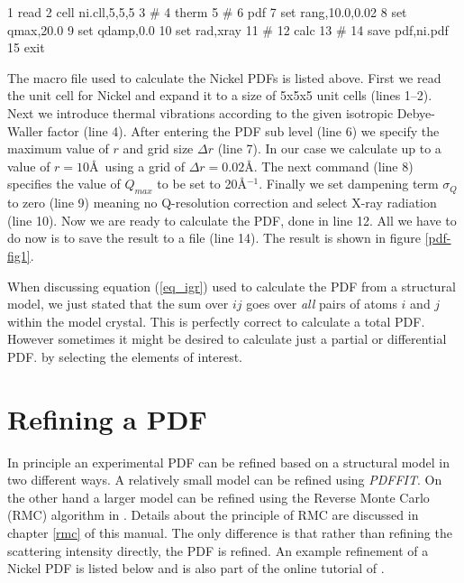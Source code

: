 \begin{MacVerbatim}
      1 read
      2 cell ni.cll,5,5,5
      3 #
      4 therm
      5 #
      6 pdf
      7   set rang,10.0,0.02
      8   set qmax,20.0
      9   set qdamp,0.0
     10   set rad,xray
     11 #
     12   calc
     13 #
     14   save pdf,ni.pdf
     15 exit
\end{MacVerbatim}
%
The macro file used to calculate the Nickel PDFs is listed above.
First we read the unit cell for Nickel and expand it to a size of
5x5x5 unit cells (lines 1--2). Next we introduce thermal vibrations
according to the given isotropic Debye-Waller factor (line 4). After
entering the PDF sub level (line 6) we specify the maximum value of
$r$ and grid size $\Delta r$ (line 7). In our case we calculate up
to a value of $r=10$\AA\ using a grid of $\Delta r=0.02$\AA. The
next command (line 8) specifies the value of $Q_{max}$ to be set to
20\AA$^{-1}$. Finally we set dampening term $\sigma_{Q}$ to 
zero (line 9) meaning
no Q-resolution correction and select X-ray radiation (line 10). Now
we are ready to calculate the PDF, done in line 12. All we have to
do now is to save the result to a file (line 14). The result is
shown in figure \ref{pdf-fig1}. \par

When discussing equation (\ref{eq_igr}) used to calculate the PDF
from a structural model, we just stated that the sum over $ij$ goes
over {\it all} pairs of atoms $i$ and $j$ within the model crystal.
This is perfectly correct to calculate a total PDF. However
sometimes it might be desired to calculate just a partial or
differential PDF. by selecting the elements of interest.


\section{Refining a PDF \label{pdf-rmc}}

In principle an experimental PDF can be refined based on a
structural model in two different ways. A relatively small model can
be refined using {\it PDFFIT}. On the other hand a larger model can
be refined using the Reverse Monte Carlo (RMC) algorithm in 
\discus. Details about the principle of RMC are discussed in chapter
\ref{rmc} of this manual. The only difference is that rather than
refining the scattering intensity directly, the PDF is refined. An
example refinement of a Nickel PDF is listed below and is also part
of the online tutorial of \discus.
%

